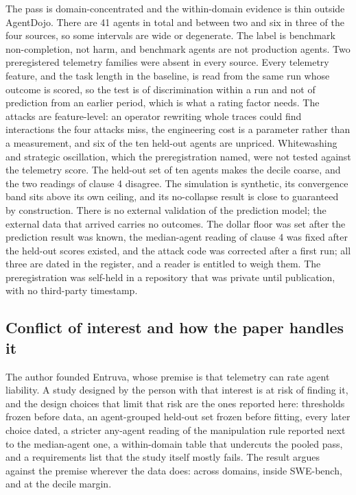 \documentclass[
  11pt,
  a4paper,
]{article}
\begin{document}
The pass is domain-concentrated and the within-domain evidence is thin
outside AgentDojo. There are 41 agents in total and between two and six
in three of the four sources, so some intervals are wide or degenerate.
The label is benchmark non-completion, not harm, and benchmark agents
are not production agents. Two preregistered telemetry families were
absent in every source. Every telemetry feature, and the task length in
the baseline, is read from the same run whose outcome is scored, so the
test is of discrimination within a run and not of prediction from an
earlier period, which is what a rating factor needs. The attacks are
feature-level: an operator rewriting whole traces could find
interactions the four attacks miss, the engineering cost is a parameter
rather than a measurement, and six of the ten held-out agents are
unpriced. Whitewashing and strategic oscillation, which the
preregistration named, were not tested against the telemetry score. The
held-out set of ten agents makes the decile coarse, and the two readings
of clause 4 disagree. The simulation is synthetic, its convergence band
sits above its own ceiling, and its no-collapse result is close to
guaranteed by construction. There is no external validation of the
prediction model; the external data that arrived carries no outcomes.
The dollar floor was set after the prediction result was known, the
median-agent reading of clause 4 was fixed after the held-out scores
existed, and the attack code was corrected after a first run; all three
are dated in the register, and a reader is entitled to weigh them. The
preregistration was self-held in a repository that was private until
publication, with no third-party timestamp.

\hypertarget{conflict-of-interest-and-how-the-paper-handles-it}{%
\subsection{Conflict of interest and how the paper handles
it}\label{conflict-of-interest-and-how-the-paper-handles-it}}

The author founded Entruva, whose premise is that telemetry can rate
agent liability. A study designed by the person with that interest is at
risk of finding it, and the design choices that limit that risk are the
ones reported here: thresholds frozen before data, an agent-grouped
held-out set frozen before fitting, every later choice dated, a stricter
any-agent reading of the manipulation rule reported next to the
median-agent one, a within-domain table that undercuts the pooled pass,
and a requirements list that the study itself mostly fails. The result
argues against the premise wherever the data does: across domains,
inside SWE-bench, and at the decile margin.
\end{document}
